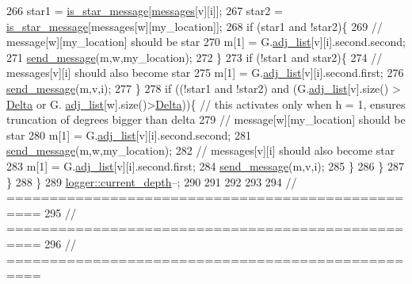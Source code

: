 \begin{DoxyCode}
266         star1 = \hyperlink{classgraph__message_a55ff5531a0043106369e84a7bc45e22d}{is\_star\_message}[\hyperlink{classgraph__message_af680c8a1755cf8d4aba389c1a3d6634e}{messages}[v][i]];
267         star2 = \hyperlink{classgraph__message_a55ff5531a0043106369e84a7bc45e22d}{is\_star\_message}[messages[w][my\_location]];
268         \textcolor{keywordflow}{if} (star1 and !star2)\{
269           \textcolor{comment}{// message[w][my\_location] should be star}
270           m[1] = G.\hyperlink{classmarked__graph_a1a0bf7ca413a278763f7c878b3b6fd6f}{adj\_list}[v][i].second.second;
271           \hyperlink{classgraph__message_aa76d1d5420a12477fa1dddd878d78c8f}{send\_message}(m,w,my\_location);
272         \}
273         \textcolor{keywordflow}{if} (!star1 and star2)\{
274           \textcolor{comment}{// messages[v][i] should also become star}
275           m[1] = G.\hyperlink{classmarked__graph_a1a0bf7ca413a278763f7c878b3b6fd6f}{adj\_list}[v][i].second.first;
276           \hyperlink{classgraph__message_aa76d1d5420a12477fa1dddd878d78c8f}{send\_message}(m,v,i);
277         \}
278         \textcolor{keywordflow}{if} ((!star1 and !star2) and (G.\hyperlink{classmarked__graph_a1a0bf7ca413a278763f7c878b3b6fd6f}{adj\_list}[v].size() > \hyperlink{classgraph__message_a45dfd061b7bc73572e5132fbf66efd55}{Delta} or G.
      \hyperlink{classmarked__graph_a1a0bf7ca413a278763f7c878b3b6fd6f}{adj\_list}[w].size()>\hyperlink{classgraph__message_a45dfd061b7bc73572e5132fbf66efd55}{Delta}))\{ \textcolor{comment}{// this activates only when h = 1, ensures truncation of degrees
       bigger than delta}
279           \textcolor{comment}{// message[w][my\_location] should be star}
280           m[1] = G.\hyperlink{classmarked__graph_a1a0bf7ca413a278763f7c878b3b6fd6f}{adj\_list}[v][i].second.second;
281           \hyperlink{classgraph__message_aa76d1d5420a12477fa1dddd878d78c8f}{send\_message}(m,w,my\_location);
282           \textcolor{comment}{// messages[v][i] should also become star}
283           m[1] = G.\hyperlink{classmarked__graph_a1a0bf7ca413a278763f7c878b3b6fd6f}{adj\_list}[v][i].second.first;
284           \hyperlink{classgraph__message_aa76d1d5420a12477fa1dddd878d78c8f}{send\_message}(m,v,i);
285         \}
286       \}
287     \}
288   \}
289   \hyperlink{classlogger_a9d29b49bd318a719a8e85b59eac54fe0}{logger::current\_depth}--;
290 
291 
292 
293 
294   \textcolor{comment}{// ==================================================}
295   \textcolor{comment}{// ==================================================}
296   \textcolor{comment}{// ==================================================}

\end{DoxyCode}
